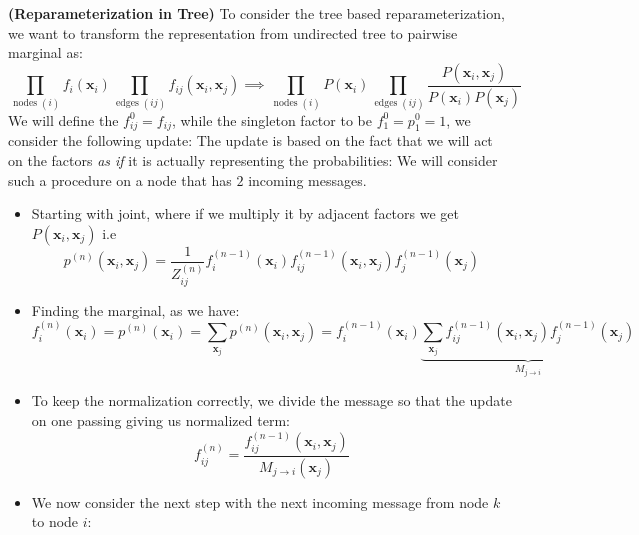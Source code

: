 \begin{remark}{\textbf{(Reparameterization in Tree)}}
    To consider the tree based reparameterization, we want to transform the representation from undirected tree to pairwise marginal as:
    \begin{equation*}
        \prod_{\operatorname{nodes}(i)} f_i(\boldsymbol x_i)\prod_{\operatorname{edges}(ij)} f_{ij}(\boldsymbol x_i, \boldsymbol x_j) \implies \prod_{\operatorname{nodes}(i)}P(\boldsymbol x_i)\prod_{\operatorname{edges}(ij)}\frac{P(\boldsymbol x_i, \boldsymbol x_j)}{P(\boldsymbol x_i)P(\boldsymbol x_j)}
    \end{equation*}
    We will define the $f^0_{ij} = f_{ij}$, while the singleton factor to be $f^0_1 = p^0_1 = 1$, we consider the following update: The update is based on the fact that we will act on the factors \emph{as if} it is actually representing the probabilities: We will consider such a procedure on a node that has $2$ incoming messages. 
    \begin{itemize}
        \item Starting with joint, where if we multiply it by adjacent factors we get $P(\boldsymbol x_i, \boldsymbol x_j)$ i.e
        \begin{equation*}
            p^{(n)}(\boldsymbol x_i, \boldsymbol x_j) = \frac{1}{Z_{ij}^{(n)}} f^{(n-1)}_i(\boldsymbol x_i)f^{(n-1)}_{ij}(\boldsymbol x_i, \boldsymbol x_j) f^{(n-1)}_j(\boldsymbol x_j)
        \end{equation*}
        \item Finding the marginal, as we have:
        \begin{equation*}
            f^{(n)}_i(\boldsymbol x_i) = p^{(n)}(\boldsymbol x_i) = \sum_{\boldsymbol x_j}p^{(n)}(\boldsymbol x_i, \boldsymbol x_j) = f^{(n-1)}_i(\boldsymbol x_i)\underbrace{\sum_{\boldsymbol x_j} f^{(n-1)}_{ij}(\boldsymbol x_i, \boldsymbol x_j) f^{(n-1)}_j(\boldsymbol x_j)}_{M_{j\rightarrow i}}
        \end{equation*}
        \item To keep the normalization correctly, we divide the message so that the update on one passing giving us normalized term:
        \begin{equation*}
            f^{(n)}_{ij} = \frac{f^{(n-1)}_{ij}(\boldsymbol x_i, \boldsymbol x_j)}{M_{j\rightarrow i}(\boldsymbol x_j)}
        \end{equation*}
        \item We now consider the next step with the next incoming message from node $k$ to node $i$:

\end{itemize}
\end{remark}
